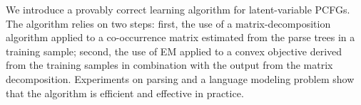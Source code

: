 We introduce a provably correct learning algorithm for latent-variable PCFGs. The algorithm relies on two steps: first, the use of a matrix-decomposition algorithm applied to a co-occurrence matrix estimated from the parse trees in a training sample; second, the use of EM applied to a convex objective derived from the training samples in combination with the output from the matrix decomposition. Experiments on parsing and a language modeling problem show that the algorithm is efficient and effective in practice.

